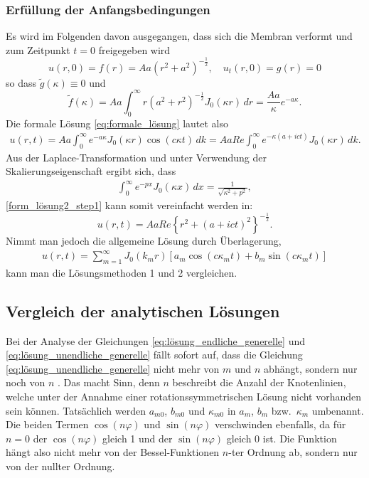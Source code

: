 \subsubsection{Erfüllung der Anfangsbedingungen
\label{subsub:erfüllung_AB}}
Es wird im Folgenden davon ausgegangen, dass sich die Membran verformt und zum Zeitpunkt $t=0$ freigegeben wird
\begin{equation*}
	u(r,0)=f(r)=Aa(r^2 + a^2)^{-\frac{1}{2}}, \quad u_t(r,0)=g(r)=0
\end{equation*}
so dass $\tilde{g}(\kappa)\equiv 0$ und
\begin{equation*}
	\tilde{f}(\kappa)=Aa\int_{0}^{\infty}r(a^2 + r^2)^{-\frac{1}{2}} J_0 (\kappa r) \, dr=\frac{Aa}{\kappa}e^{-a\kappa}.
\end{equation*}
Die formale Lösung  \eqref{eq:formale_lösung} lautet also
\begin{align}
	u(r,t)=Aa\int_{0}^{\infty}e^{-a\kappa} J_0(\kappa r)\cos(c\kappa t) \, dk=AaRe\int_{0}^{\infty}e^{-\kappa(a+ict)} J_0(\kappa r) \, dk.
	\label{form_lösung2_step1}
\end{align}
Aus der Laplace-Transformation und unter Verwendung der Skalierungseigenschaft \cite{noauthor_laplace_nodate} ergibt sich, dass
\begin{align*}
	\int_{0}^{\infty}e^{-px} J_0(\kappa x) \, dx
	=
	\frac{1}{\sqrt{\kappa^2 + p^2}},
\end{align*}	
\eqref{form_lösung2_step1} kann somit vereinfacht werden in:
\begin{equation*}
	u(r,t)=AaRe\left\{r^2+\left(a+ict\right)^2\right\}^{-\frac{1}{2}}.
\end{equation*}
Nimmt man jedoch die allgemeine Lösung durch Überlagerung, 
\begin{align}
	u(r, t) = \displaystyle\sum_{m=1}^{\infty} J_0 (k_{m}r)[a_{m}\cos(c \kappa_{m} t)+b_{m}\sin(c \kappa_{m} t)]
	\label{eq:lösung_unendliche_generelle}
\end{align}
kann man die Lösungsmethoden 1 und 2 vergleichen.

\subsection{Vergleich der analytischen Lösungen
\label{kreismembran:vergleich}}
Bei der Analyse der Gleichungen \eqref{eq:lösung_endliche_generelle}
und \eqref{eq:lösung_unendliche_generelle} fällt sofort auf, dass
die Gleichung \eqref{eq:lösung_unendliche_generelle} nicht mehr von
$m$ und $n$ abhängt, sondern nur noch von $n$
\cite{nishanth_p_vibrations_2018}.
Das macht Sinn, denn $n$ beschreibt die Anzahl der Knotenlinien,
welche unter der Annahme einer rotationssymmetrischen Lösung nicht
vorhanden sein können.
Tatsächlich werden $a_{m0}$, $b_{m0}$ und $\kappa_{m0}$ in $a_m$, $b_m$
bzw.~$\kappa_m$ umbenannt.
Die beiden Termen $\cos(n\varphi)$ und $\sin(n\varphi)$ verschwinden
ebenfalls, da für $n=0$ der $\cos(n\varphi)$ gleich 1 und der
$\sin(n \varphi)$ gleich 0 ist.
Die Funktion hängt also nicht mehr von der Bessel-Funktionen $n$-ter
Ordnung ab, sondern nur von der nullter Ordnung. 


